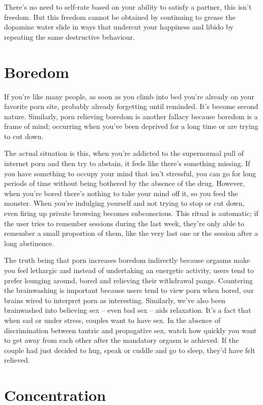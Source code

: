 \documentclass[
]{book}
\begin{document}
There's no need to self-rate based on your ability to satisfy a partner, this isn't freedom. But this freedom cannot be obtained by continuing to grease the dopamine water slide in ways that undercut your happiness and libido by repeating the same destructive behaviour.

\hypertarget{boredom}{%
\section{Boredom}\label{boredom}}

If you're like many people, as soon as you climb into bed you're already on your favorite porn site, probably already forgetting until reminded. It's become second nature. Similarly, porn relieving boredom is another fallacy because boredom is a frame of mind; occurring when you've been deprived for a long time or are trying to cut down.

The actual situation is this, when you're addicted to the supernormal pull of internet porn and then try to abstain, it feels like there's something missing. If you have something to occupy your mind that isn't stressful, you can go for long periods of time without being bothered by the absence of the drug. However, when you're bored there's nothing to take your mind off it, so you feed the monster. When you're indulging yourself and not trying to stop or cut down, even firing up private browsing becomes subconscious. This ritual is automatic; if the user tries to remember sessions during the last week, they're only able to remember a small proportion of them, like the very last one or the session after a long abstinence.

The truth being that porn increases boredom indirectly because orgasms make you feel lethargic and instead of undertaking an energetic activity, users tend to prefer lounging around, bored and relieving their withdrawal pangs. Countering the brainwashing is important because users tend to view porn when bored, our brains wired to interpret porn as interesting. Similarly, we've also been brainwashed into believing sex -- even bad sex -- aids relaxation. It's a fact that when sad or under stress, couples want to have sex. In the absence of discrimination between tantric and propagative sex, watch how quickly you want to get away from each other after the mandatory orgasm is achieved. If the couple had just decided to hug, speak or cuddle and go to sleep, they'd have felt relieved.

\hypertarget{concentration}{%
\section{Concentration}\label{concentration}}
\end{document}
